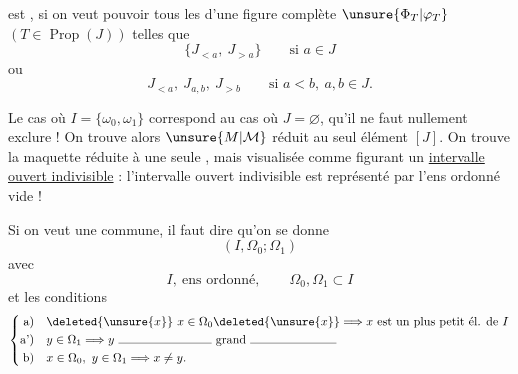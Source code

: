 
est , si on veut pouvoir  tous les \uline{} d'une figure complète $\unsure{\Phi_T|\varphi_T}$ $(T\in\operatorname{Prop}(J))$ telles que
\[
\{J_{<a},\ J_{>a}\}\qquad\text{si }a\in J
\]
ou
\[
J_{<a},\ J_{a,b},\ J_{>b}\qquad\text{si }a<b,\ a,b\in J.
\]

 Le cas où $I=\{\omega_0,\omega_1\}$ correspond au cas où $J=\varnothing$, qu'il ne faut nullement exclure ! On trouve alors $\unsure{M|\mathcal M}$ réduit au seul élément $[J]$. On trouve la maquette réduite à une seule , mais visualisée comme figurant un \uline{intervalle ouvert indivisible} : l'intervalle ouvert indivisible est représenté par l'ens ordonné vide !

Si on veut une  commune, il faut dire qu'on se donne
\[
(I,\Omega_0;\Omega_1)
\]
avec
\[
I,\ \text{ens ordonné},\qquad\Omega_0,\Omega_1\subset I
\]
et les conditions
\[
\left\{
\begin{aligned}
\text{a)}\quad&\deleted{\unsure{x}}\ x\in\Omega_0\deleted{\unsure{x}}\Longrightarrow x\text{ est un plus petit él. de }I\\
\text{a')}\quad&y\in\Omega_1\Longrightarrow y\ \text{\rule{2.7cm}{0.35pt}\ grand \rule{2.5cm}{0.35pt}}\\
\text{b)}\quad&x\in\Omega_0,\ y\in\Omega_1\Longrightarrow x\neq y.
\end{aligned}
\right.
\]
